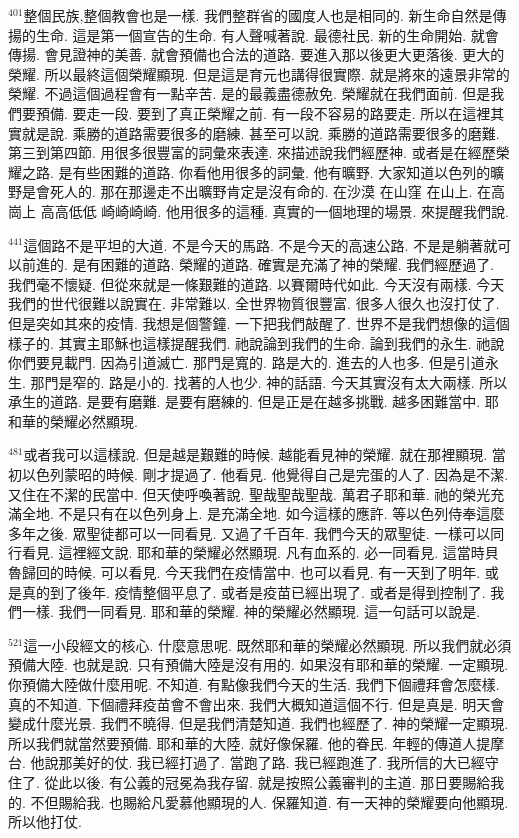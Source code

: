 \documentclass{book}
\begin{document}
$^{401}$整個民族,整個教會也是一樣.
我們整群省的國度人也是相同的.
新生命自然是傳揚的生命.
這是第一個宣告的生命.
有人聲喊著說.
最德社民.
新的生命開始.
就會傳揚.
會見證神的美善.
就會預備也合法的道路.
要進入那以後更大更落後.
更大的榮耀.
所以最終這個榮耀顯現.
但是這是育元也講得很實際.
就是將來的遠景非常的榮耀.
不過這個過程會有一點辛苦.
是的最義盡德赦免.
榮耀就在我們面前.
但是我們要預備.
要走一段.
要到了真正榮耀之前.
有一段不容易的路要走.
所以在這裡其實就是說.
乘勝的道路需要很多的磨練.
甚至可以說.
乘勝的道路需要很多的磨難.
第三到第四節.
用很多很豐富的詞彙來表達.
來描述說我們經歷神.
或者是在經歷榮耀之路.
是有些困難的道路.
你看他用很多的詞彙.
他有曠野.
大家知道以色列的曠野是會死人的.
那在那邊走不出曠野肯定是沒有命的.
在沙漠 在山窪 在山上.
在高崗上 高高低低 崎崎崎崎.
他用很多的這種.
真實的一個地理的場景.
來提醒我們說.

$^{441}$這個路不是平坦的大道.
不是今天的馬路.
不是今天的高速公路.
不是是躺著就可以前進的.
是有困難的道路.
榮耀的道路.
確實是充滿了神的榮耀.
我們經歷過了.
我們毫不懷疑.
但從來就是一條艱難的道路.
以賽爾時代如此.
今天沒有兩樣.
今天我們的世代很難以說實在.
非常難以.
全世界物質很豐富.
很多人很久也沒打仗了.
但是突如其來的疫情.
我想是個警鐘.
一下把我們敲醒了.
世界不是我們想像的這個樣子的.
其實主耶穌也這樣提醒我們.
祂說論到我們的生命.
論到我們的永生.
祂說你們要見載門.
因為引道滅亡.
那門是寬的.
路是大的.
進去的人也多.
但是引道永生.
那門是窄的.
路是小的.
找著的人也少.
神的話語.
今天其實沒有太大兩樣.
所以承生的道路.
是要有磨難.
是要有磨練的.
但是正是在越多挑戰.
越多困難當中.
耶和華的榮耀必然顯現.

$^{481}$或者我可以這樣說.
但是越是艱難的時候.
越能看見神的榮耀.
就在那裡顯現.
當初以色列蒙昭的時候.
剛才提過了.
他看見.
他覺得自己是完蛋的人了.
因為是不潔.
又住在不潔的民當中.
但天使呼喚著說.
聖哉聖哉聖哉.
萬君子耶和華.
祂的榮光充滿全地.
不是只有在以色列身上.
是充滿全地.
如今這樣的應許.
等以色列侍奉這麼多年之後.
眾聖徒都可以一同看見.
又過了千百年.
我們今天的眾聖徒.
一樣可以同行看見.
這裡經文說.
耶和華的榮耀必然顯現.
凡有血系的.
必一同看見.
這當時貝魯歸回的時候.
可以看見.
今天我們在疫情當中.
也可以看見.
有一天到了明年.
或是真的到了後年.
疫情整個平息了.
或者是疫苗已經出現了.
或者是得到控制了.
我們一樣.
我們一同看見.
耶和華的榮耀.
神的榮耀必然顯現.
這一句話可以說是.

$^{521}$這一小段經文的核心.
什麼意思呢.
既然耶和華的榮耀必然顯現.
所以我們就必須預備大陸.
也就是說.
只有預備大陸是沒有用的.
如果沒有耶和華的榮耀.
一定顯現.
你預備大陸做什麼用呢.
不知道.
有點像我們今天的生活.
我們下個禮拜會怎麼樣.
真的不知道.
下個禮拜疫苗會不會出來.
我們大概知道這個不行.
但是真是.
明天會變成什麼光景.
我們不曉得.
但是我們清楚知道.
我們也經歷了.
神的榮耀一定顯現.
所以我們就當然要預備.
耶和華的大陸.
就好像保羅.
他的眷民.
年輕的傳道人提摩台.
他說那美好的仗.
我已經打過了.
當跑了路.
我已經跑進了.
我所信的大已經守住了.
從此以後.
有公義的冠冕為我存留.
就是按照公義審判的主道.
那日要賜給我的.
不但賜給我.
也賜給凡愛慕他顯現的人.
保羅知道.
有一天神的榮耀要向他顯現.
所以他打仗.
\end{document}
